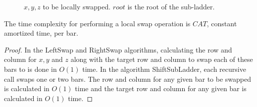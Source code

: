 \begin{figure}[!htp]
\begin{center}
\begin{minipage}{.5\textwidth}
	 \end{minipage}
	 \end{center}
	\caption{$x,y,z$ to be locally swapped. $root$ is the root of the sub-ladder.}
	\label{Fig:SwapAndShift}
\end{figure}

\begin{lemma}[h]
	The time complexity for performing a local swap operation is $CAT$, constant amortized time, per bar. 
\end{lemma}
\begin{proof}
	In the {\sc LeftSwap} and {\sc RightSwap} algorithms, calculating the row and column for $x,y$ and $z$ 
	along with the target row and column to swap each of these bars to is done in $O(1)$ time.
	In the algorithm {\sc ShiftSubLadder}, each recursive call swaps one or two bars. The row and 
	column for any given bar to be swapped is calculated in $O(1)$ time and the target row 
	and column for any given bar is calculated in $O(1)$ time.
\end{proof}







